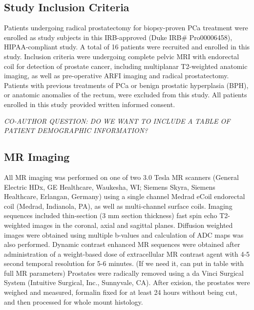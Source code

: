 \subsection{Study Inclusion Criteria}
Patients undergoing radical prostatectomy for biopsy-proven PCa treatment were
enrolled as study subjects in this IRB-approved (Duke IRB\# Pro00006458),
HIPAA-compliant study.  A total of 16 patients were recruited and enrolled in
this study.  Inclusion criteria were undergoing complete pelvic MRI with
endorectal coil for detection of prostate cancer, including multiplanar
T2-weighted anatomic imaging, as well as pre-operative ARFI imaging and radical
prostatectomy.  Patients with previous treatments of PCa or benign prostatic
hyperplasia (BPH), or anatomic anomalies of the rectum, were excluded from this
study.  All patients enrolled in this study provided written informed consent. 

\emph{CO-AUTHOR QUESTION: DO WE WANT TO INCLUDE A TABLE OF PATIENT DEMOGRAPHIC INFORMATION?}

\subsection{MR Imaging}
All MR imaging was performed on one of two 3.0 Tesla MR scanners (General
Electric HDx, GE Healthcare, Waukesha, WI;  Siemens Skyra, Siemens Healthcare,
Erlangan, Germany) using a single channel Medrad eCoil endorectal coil (Medrad,
Indianola, PA), as well as multi-channel surface coils.  Imaging sequences
included thin-section (3 mm section thickness) fast spin echo T2-weighted
images in the coronal, axial and sagittal planes.  Diffusion weighted images
were obtained using multiple b-values and calculation of ADC maps was also
performed.  Dynamic contrast enhanced MR sequences were obtained after
administration of a weight-based dose of extracellular MR contrast agent with
4-5 second temporal resolution for 5-6 minutes. (If we need it, can put in
table with full MR parameters) Prostates were radically removed using a da
Vinci Surgical System (Intuitive Surgical\textregistered, Inc., Sunnyvale, CA).
After exision, the prostates were weighed and measured, formalin fixed for at
least 24 hours without being cut, and then processed for whole mount histology.
